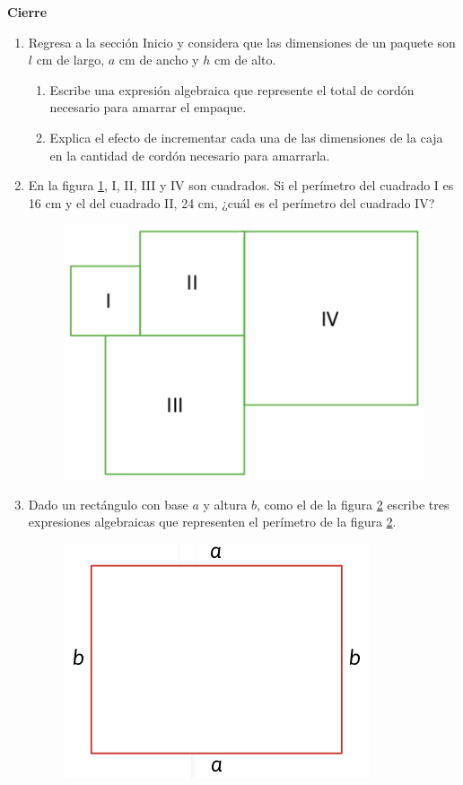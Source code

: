 \documentclass[11pt]{book}
\begin{document}
\begin{boxK}
  \begin{center}\textbf{Cierre}\end{center}

  \begin{enumerate}
    \item Regresa a la sección Inicio y considera que las dimensiones de un paquete son $l$ cm de largo, $a$ cm de ancho y $h$ cm de alto.
          \begin{enumerate}
            \item Escribe una expresión algebraica que represente el total
                  de cordón necesario para amarrar el empaque.
            \item Explica el efecto de incrementar cada una de las dimensiones de la caja en la cantidad de cordón necesario
                  para amarrarla.
          \end{enumerate}
    \item En la figura \ref{fig:cuadrados}, I, II, III y IV son cuadrados. Si el perímetro del cuadrado I es 16 cm y
          el del cuadrado II, 24 cm, ¿cuál es el perímetro del cuadrado IV?
          \begin{figure}[H]
            \centering
            \includegraphics[width=.25\linewidth]{cuadrados.png}
            \label{fig:cuadrados}
          \end{figure}
    \item Dado un rectángulo con base $a$ y altura $b$, como el de la figura \ref{fig:rectangulo}
          escribe tres expresiones algebraicas que
          representen el perímetro de la figura \ref{fig:rectangulo}.
          \begin{figure}[H]
            \centering
            \includegraphics[width=.25\linewidth]{rectangulo.png}
            \label{fig:rectangulo}
          \end{figure}

\end{enumerate}
\end{boxK}
\end{document}
